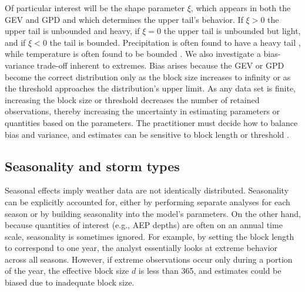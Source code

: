 \documentclass{ametsocV6.1}
\begin{document}
Of particular interest will be the shape parameter $\xi$, which appears in both the GEV and GPD and which determines the upper tail's behavior.
If $\xi > 0$ the upper tail is unbounded and heavy, if $\xi = 0$ the upper tail is unbounded but light, and if $\xi < 0$ the tail is bounded.
Precipitation is often found to have a heavy tail \citep{nasem2024pmp}, while temperature is often found to be bounded \citep[e.g.,][]{philip2022rapid,bercos2022anthropogenic}.
We also investigate a bias-variance trade-off inherent to extremes.
Bias arises because the GEV or GPD become the correct distribution only as the block size increases to infinity or as the threshold approaches the distribution's upper limit.
As any data set is finite, increasing the block size or threshold decreases the number of retained observations, thereby increasing the uncertainty in estimating parameters or quantities based on the parameters.
The practitioner must decide how to balance bias and variance, and estimates can be sensitive to block length or threshold \citep[e.g.,][]{ben2020evaluation}. 


\subsection{Seasonality and storm types}


Seasonal effects imply weather data are not identically distributed.
Seasonality can be explicitly accounted for, either by performing separate analyses for each season or by building seasonality into the model's parameters.
On the other hand, because quantities of interest (e.g., AEP depths) are often on an annual time scale, seasonality is sometimes ignored.
For example, by setting the block length to correspond to one year, the analyst essentially looks at extreme behavior across all seasons.
However, if extreme observations occur only during a portion of the year, the effective block size $d$ is less than 365, and estimates could be biased due to inadequate block size.
\end{document}
